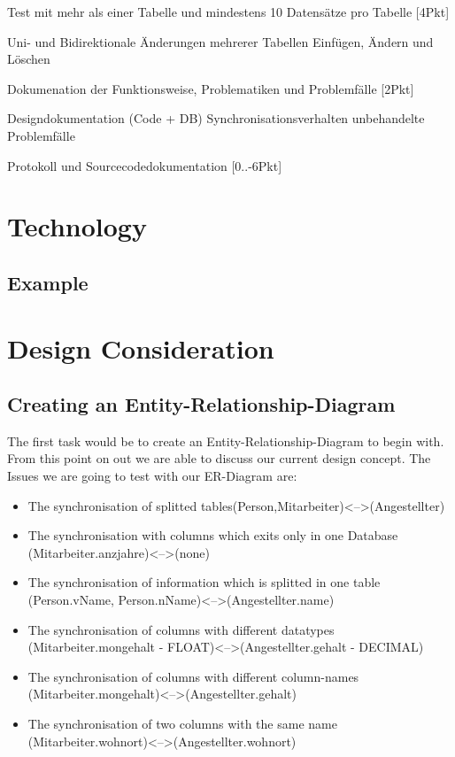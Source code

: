 \documentclass[11pt,a4paper]{article}
\begin{document}
\noindent Test mit mehr als einer Tabelle und mindestens 10 Datensätze pro Tabelle [4Pkt]

\noindent Uni- und Bidirektionale Änderungen mehrerer Tabellen
Einfügen, Ändern und Löschen

\noindent Dokumenation der Funktionsweise, Problematiken und Problemfälle [2Pkt]

\noindent Designdokumentation (Code + DB)
Synchronisationsverhalten
unbehandelte Problemfälle

\noindent Protokoll und Sourcecodedokumentation [0..-6Pkt]

\newpage
\section{Technology}
\subsection{Example}


\newpage
\section{Design Consideration}
\subsection{Creating an Entity-Relationship-Diagram}
The first task would be to create an Entity-Relationship-Diagram to begin with. From this point on out we are able to discuss our current design concept. The Issues we are going to test with our ER-Diagram are:

\begin{itemize}
	\item The synchronisation of splitted tables\newline  (Person,Mitarbeiter)\textless--\textgreater  (Angestellter)
	\item The synchronisation with columns which exits only in one Database \newline (Mitarbeiter.anzjahre)\textless--\textgreater (none)
	\item The synchronisation of information which is splitted in one table \newline (Person.vName, Person.nName)\textless--\textgreater (Angestellter.name)
	\item The synchronisation of columns with different datatypes \newline (Mitarbeiter.mongehalt - FLOAT)\textless--\textgreater (Angestellter.gehalt - DECIMAL)
	\item The synchronisation of columns with different column-names \newline (Mitarbeiter.mongehalt)\textless--\textgreater (Angestellter.gehalt)
	\item The synchronisation of two columns with the same name \newline (Mitarbeiter.wohnort)\textless--\textgreater (Angestellter.wohnort)
	
\end{itemize}
\end{document}
